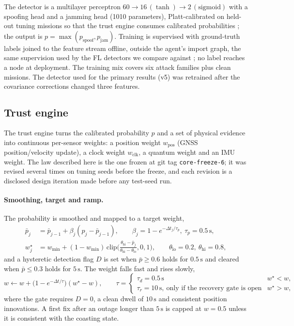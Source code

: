 \documentclass[12pt,a4paper]{article}
\begin{document}
The detector is a multilayer perceptron $60\rightarrow16\,(\tanh)\rightarrow2\,(\text{sigmoid})$ with a spoofing head and a jamming head (1010 parameters), Platt-calibrated on held-out tuning missions so that the trust engine consumes calibrated probabilities \cite{guo2017calibration}; the output is $p=\max(p_{\mathrm{spoof}},p_{\mathrm{jam}})$. Training is supervised with ground-truth labels joined to the feature stream offline, outside the agent's import graph, the same supervision used by the FL detectors we compare against \cite{khan2025enhancing,chai2025navigation}; no label reaches a node at deployment. The training mix covers six attack families plus clean missions. The detector used for the primary results (v5) was retrained after the covariance corrections changed three features.

\subsection{Trust engine}
\label{sec:trustlaw}
The trust engine turns the calibrated probability $p$ and a set of physical evidence into continuous per-sensor weights: a position weight $w_{\mathrm{pos}}$ (GNSS position/velocity update), a clock weight $w_{\mathrm{clk}}$, a quantum weight and an IMU weight. The law described here is the one frozen at git tag \texttt{core-freeze-6}; it was revised several times on tuning seeds before the freeze, and each revision is a disclosed design iteration made before any test-seed run.

\paragraph{Smoothing, target and ramp.}
The probability is smoothed and mapped to a target weight,
\begin{align}
\bar p_j &= \bar p_{j-1} + \beta_j(p_j-\bar p_{j-1}),\qquad \beta_j=1-e^{-\Delta t_j/\tau_p},\ \tau_p=0.5\,\mathrm{s},\label{eq:pbar}\\
w^{\star}_j &= w_{\min} + (1-w_{\min})\,\mathrm{clip}\!\Big(\frac{\theta_{\mathrm{hi}}-\bar p_j}{\theta_{\mathrm{hi}}-\theta_{\mathrm{lo}}},0,1\Big),\qquad \theta_{\mathrm{lo}}=0.2,\ \theta_{\mathrm{hi}}=0.8,\label{eq:target}
\end{align}
and a hysteretic detection flag $D$ is set when $\bar p\ge0.6$ holds for $0.5\,\mathrm{s}$ and cleared when $\bar p\le0.3$ holds for $5\,\mathrm{s}$. The weight falls fast and rises slowly,
\begin{equation}
w \leftarrow w + \big(1-e^{-\Delta t/\tau}\big)(w^{\star}-w),\qquad
\tau = \begin{cases}\tau_d=0.5\,\mathrm{s} & w^{\star}<w,\\ \tau_r=10\,\mathrm{s},\ \text{only if the recovery gate is open} & w^{\star}>w,\end{cases}
\label{eq:ramp}
\end{equation}
where the gate requires $D=0$, a clean dwell of $10\,\mathrm{s}$ and consistent position innovations. A first fix after an outage longer than $5\,\mathrm{s}$ is capped at $w=0.5$ unless it is consistent with the coasting state.
\end{document}
